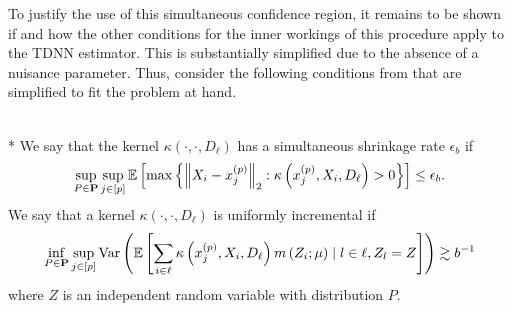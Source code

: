 To justify the use of this simultaneous confidence region, it remains to be shown if and how the other conditions for the inner workings of this procedure apply to the TDNN estimator.
This is substantially simplified due to the absence of a nuisance parameter.
Thus, consider the following conditions from \cite{ritzwoller_uniform_2024} that are simplified to fit the problem at hand.

\begin{boxD}
	\begin{dfn}\mbox{}\\*
		We say that the kernel $\kappa\left(\cdot, \cdot, D_{\ell}\right)$ has a simultaneous shrinkage rate $\epsilon_b$ if
		\begin{equation}
			\sup_{P \in \mathbf{P}} \sup_{j \in[p]}
			\mathbb{E}\left[\max \left\{\left\|X_{i}-x^{(p)}_{j}\right\|_{2}: \kappa\left(x^{(p)}_{j}, X_{i}, D_{\ell}\right)>0\right\}\right]
			\leq \epsilon_b .
		\end{equation}
		We say that a kernel $\kappa\left(\cdot, \cdot, D_{\ell}\right)$ is uniformly incremental if
		\begin{equation}
			\inf_{P \in \mathbf{P}} \sup_{j \in[p]}
			\text{Var}\left(\mathbb{E}\left[\sum_{i \in \ell} \kappa\left(x^{(p)}_{j}, X_{i}, D_{\ell}\right) m\left(Z_{i} ; \mu\right) \mid l \in \ell, Z_l = Z\right]\right)
			\gtrsim b^{-1}
		\end{equation}
		where $Z$ is an independent random variable with distribution $P$.
	\end{dfn}
\end{boxD}

